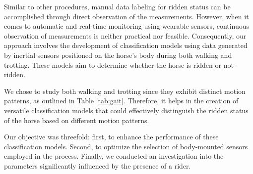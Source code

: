 Similar to other procedures, manual data labeling for ridden status can be accomplished through direct observation of the measurements. However, when it comes to automatic and real-time monitoring using wearable sensors, continuous observation of measurements is neither practical nor feasible. Consequently, our approach involves the development of classification models using data generated by inertial sensors positioned on the horse's body during both walking and trotting. These models aim to determine whether the horse is ridden or not-ridden.

We chose to study both walking and trotting since they exhibit distinct motion patterns, as outlined in Table \ref{tab:gait}. Therefore, it helps in the creation of versatile classification models that could effectively distinguish the ridden status of the horse based on different motion patterns. 

Our objective was threefold: first, to enhance the performance of these classification models. Second, to optimize the selection of body-mounted sensors employed in the process. Finally, we conducted an investigation into the parameters significantly influenced by the presence of a rider.

